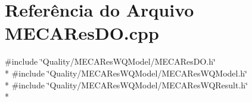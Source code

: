\section{Referência do Arquivo M\+E\+C\+A\+Res\+D\+O.\+cpp}
\label{_m_e_c_a_res_d_o_8cpp}
{\ttfamily \#include \char`\"{}Quality/\+M\+E\+C\+A\+Res\+W\+Q\+Model/\+M\+E\+C\+A\+Res\+D\+O.\+h\char`\"{}}\\*
{\ttfamily \#include \char`\"{}Quality/\+M\+E\+C\+A\+Res\+W\+Q\+Model/\+M\+E\+C\+A\+Res\+W\+Q\+Model.\+h\char`\"{}}\\*
{\ttfamily \#include \char`\"{}Quality/\+M\+E\+C\+A\+Res\+W\+Q\+Model/\+M\+E\+C\+A\+Res\+W\+Q\+Result.\+h\char`\"{}}\\*
